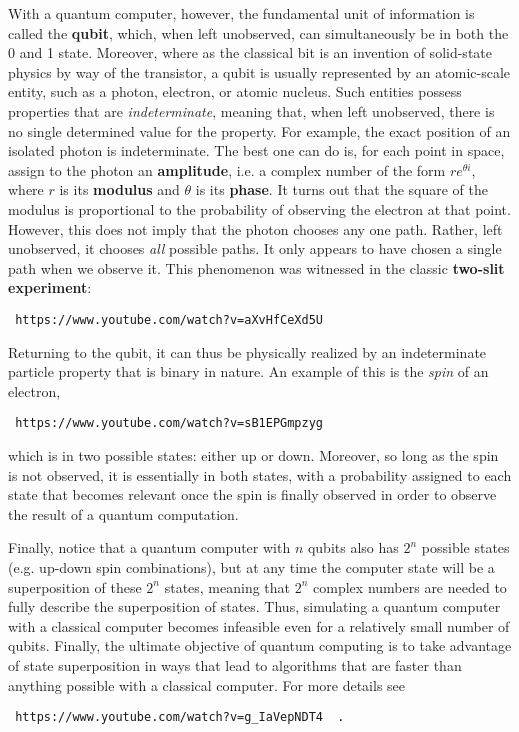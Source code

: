 \documentclass [12pt]{article}
\theoremstyle{definition}
\begin{document}
With a quantum computer, however, the fundamental unit of information is called the \textbf{qubit}, which, when left unobserved, can simultaneously be in both the 0 and 1 state.
Moreover, where as the classical bit is an invention of solid-state physics by way of the transistor, a qubit is usually represented by an atomic-scale entity, such as a photon, electron, or atomic nucleus. Such entities possess properties that are \textit{indeterminate}, meaning that, when left unobserved, there is no single determined value for the property. For example,
the exact position of an isolated photon is indeterminate. The best one can do is, for each point in space, assign to the photon an \textbf{amplitude}, i.e. a complex number
of the form $re^{\theta i}$, where $r$ is its \textbf{modulus} and $\theta$ is its \textbf{phase}. It turns out that the square of the modulus is proportional to the probability of 
observing the electron at that point. However, this does not imply that the photon chooses any one path. Rather, left unobserved, it chooses \textit{all} possible paths.
It only appears to have chosen a single path when we observe it. This phenomenon was witnessed in the classic \textbf{two-slit experiment}:
\begin{verbatim} https://www.youtube.com/watch?v=aXvHfCeXd5U \end{verbatim}

Returning to the qubit, it can thus be physically realized by an indeterminate particle property that is binary in nature. An example of this is the \textit{spin} of an electron, 

\begin{verbatim} https://www.youtube.com/watch?v=sB1EPGmpzyg \end{verbatim}

which is
in two possible states: either up or down. Moreover, so long as the spin is not observed, it is essentially in both states, with a probability assigned to each state that becomes
relevant once the spin is finally observed in order to observe the result of a quantum computation. 

Finally, notice that a quantum computer with $n$ qubits also has $2^{n}$ possible states (e.g. up-down spin combinations), but at any time the computer state will be 
a superposition of these $2^{n}$ states, meaning that $2^{n}$ complex numbers are needed to fully describe the superposition of states. Thus, simulating a quantum computer with
a classical computer becomes infeasible even for a relatively small number of qubits. Finally, the ultimate objective of quantum computing is to take advantage of 
 state superposition in ways that lead to algorithms that are faster than anything possible with a classical computer. For more details see
\begin{verbatim} https://www.youtube.com/watch?v=g_IaVepNDT4  . \end{verbatim}
\end{document}
